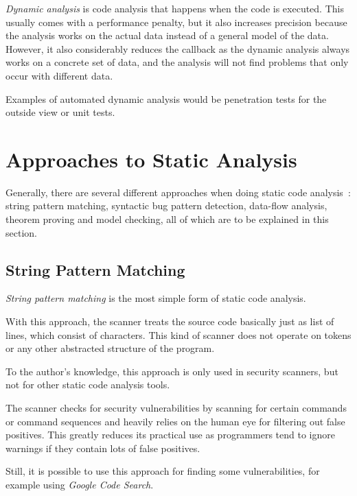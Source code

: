 \emph{Dynamic analysis} is code analysis that happens when the code is executed. This usually comes with a performance penalty, but it also increases precision because the analysis works on the actual data instead of a general model of the data.~\cite{chess-west} However, it also considerably reduces the callback as the dynamic analysis always works on a concrete set of data, and the analysis will not find problems that only occur with different data.~\cite{static-code-analysis}

Examples of automated dynamic analysis would be penetration tests for the outside view or unit tests.



\section{Approaches to Static Analysis}
Generally, there are several different approaches when doing static code analysis~\cite{comparison-of-bug-finding-tools}: string pattern matching, syntactic bug pattern detection, data-flow analysis, theorem proving and model checking, all of which are to be explained in this section.


\subsection{String Pattern Matching}

\emph{String pattern matching} is the most simple form of static code analysis.

With this ap\-proach, the scanner treats the source code basically just as list of lines, which consist of characters. This kind of scanner does not operate on tokens or any other abstracted structure of the program.

To the author's knowledge, this approach is only used in security scanners, but not for other static code analysis tools.

The scanner checks for security vulnerabilities by scanning for certain commands or command sequences and heavily relies on the human eye for filtering out false positives. This greatly reduces its practical use as programmers tend to ignore warnings if they contain lots of false positives.~\cite{understanding-value}

Still, it is possible to use this approach for finding some vulnerabilities, for example using \emph{Google Code Search}.~\cite{google-code-search}

